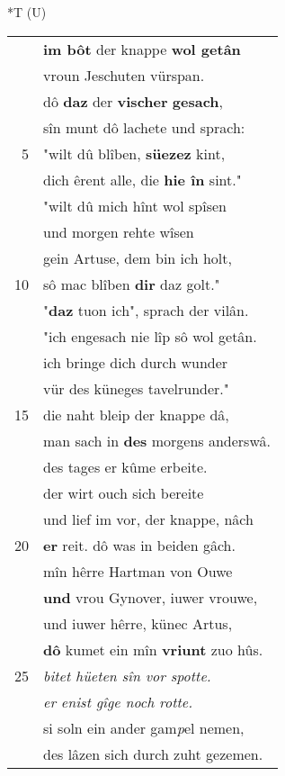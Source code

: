 \documentclass[8pt,a4paper,notitlepage]{article}
\begin{document}
\begin{table}[ht]
\begin{minipage}[t]{0.5\linewidth}
\end{minipage}
\hspace{0.5cm}
\begin{minipage}[t]{0.5\linewidth}
\small
\begin{center}*T (U)
\end{center}
\begin{tabular}{rl}
 & \textbf{im bôt} der knappe \textbf{wol getân}\\ 
 & vroun Jeschuten vürspan.\\ 
 & dô \textbf{daz} der \textbf{vischer} \textbf{gesach},\\ 
 & sîn munt dô lachete und sprach:\\ 
5 & "wilt dû blîben, \textbf{süezez} kint,\\ 
 & dich êrent alle, die \textbf{hie în} sint."\\ 
 & "wilt dû mich hînt wol spîsen\\ 
 & und morgen rehte wîsen\\ 
 & gein Artuse, dem bin ich holt,\\ 
10 & sô mac blîben \textbf{dir} daz golt."\\ 
 & "\textbf{daz} tuon ich", sprach der vilân.\\ 
 & "ich engesach nie lîp sô wol getân.\\ 
 & ich bringe dich durch wunder\\ 
 & vür des küneges tavelrunder."\\ 
15 & die naht bleip der knappe dâ,\\ 
 & man sach in \textbf{des} morgens anderswâ.\\ 
 & des tages er kûme erbeite.\\ 
 & der wirt ouch sich bereite\\ 
 & und lief im vor, der knappe, nâch\\ 
20 & \textbf{er} reit. dô was in beiden gâch.\\ 
 & mîn hêrre Hartman von Ouwe\\ 
 & \textbf{und} vrou Gynover, iuwer vrouwe,\\ 
 & und iuwer hêrre, künec Artus,\\ 
 & \textbf{dô} kumet ein mîn \textbf{vriunt} zuo hûs.\\ 
25 & \textit{bitet hüeten sîn vor spotte.}\\ 
 & \textit{er enist gîge noch rotte.}\\ 
 & si soln ein ander gam\textit{p}el nemen,\\ 
 & des lâzen sich durch zuht gezemen.\\ 

\end{tabular}
\end{minipage}
\end{table}
\end{document}
